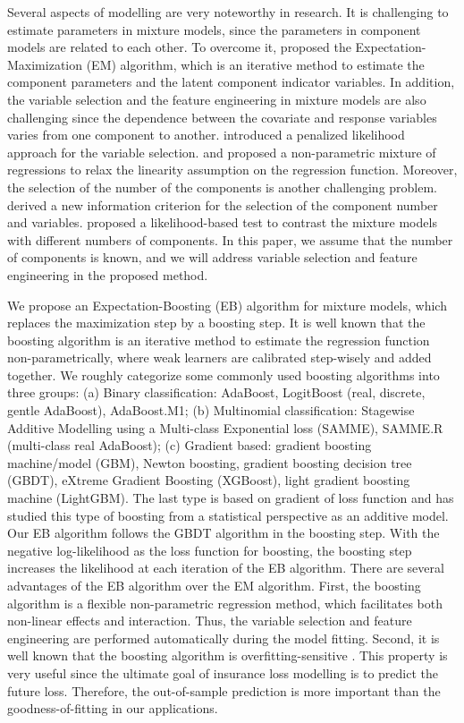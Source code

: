 \documentclass[11pt]{article}
\numberwithin{equation}{section}
\begin{document}
Several aspects of modelling are very noteworthy in research. It is challenging to estimate parameters in mixture models, since the parameters in component models are related to each other.
To overcome it,  \citet{dempster1977maximum} proposed the Expectation-Maximization (EM) algorithm, which is an iterative method to estimate the component parameters and the latent component indicator variables. 
In addition, the variable selection and the feature engineering in mixture models are also challenging since the dependence between the covariate and response variables varies from one component to another.  
\citet{khalili2007variable} introduced a penalized likelihood approach for the variable selection.
\citet{huang2012mixture} and \citet{huang2013nonparametric} proposed a non-parametric mixture of regressions to relax the linearity assumption on the regression function.
Moreover, the selection of the number of the components is another challenging problem.
\citet{naik2007extending} derived a new information criterion for the selection of the component number and variables.
\citet{kasahara2015testing} proposed a likelihood-based test to contrast  the mixture models with different numbers of components. 
In this paper, we assume that the number of components is known, and we will address variable selection and feature engineering in the proposed method.

We propose an Expectation-Boosting (EB) algorithm for mixture models, which replaces the maximization step by a boosting step. 
It is well known that the boosting algorithm is an iterative method to estimate the regression function non-parametrically, where weak learners are calibrated step-wisely and added together.
We roughly categorize some commonly used boosting algorithms into three groups: 
(a) Binary classification: {AdaBoost}, LogitBoost (real, discrete, gentle AdaBoost), AdaBoost.M1; 
(b) Multinomial classification: Stagewise Additive Modelling using a Multi-class Exponential loss (SAMME), SAMME.R (multi-class real AdaBoost); 
(c) {Gradient based}: {gradient boosting machine/model (GBM)}, Newton boosting, gradient boosting decision tree (GBDT), {eXtreme Gradient Boosting (XGBoost)}, {light gradient boosting machine (LightGBM)}.
The last type is based on {gradient of loss function} and \citet{friedman2001greedy} has studied this type of boosting from a statistical perspective as an additive model.
Our EB algorithm follows the GBDT algorithm in the boosting step.
With the negative log-likelihood as the loss function for boosting, the boosting step increases the likelihood at each iteration of the EB algorithm. 
There are several advantages of the EB algorithm over the EM algorithm. 
First, the boosting algorithm is a flexible non-parametric regression method, which facilitates both non-linear effects and interaction. Thus, the variable selection and feature engineering are performed automatically during the model fitting. 
Second, it is well known that the boosting algorithm is overfitting-sensitive \citep{buehlmann:2003}. This property is very useful since the ultimate goal of insurance loss modelling is to predict the future loss. Therefore,
the out-of-sample prediction is more important than the goodness-of-fitting in our applications. 
\end{document}
